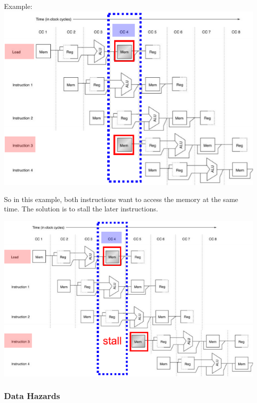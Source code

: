 \documentclass[letterpaper,12pt]{article}
\begin{document}
Example:
\includegraphics*[scale = 0.7]{./Image/Structural Hazard example.png}

So in this example, both instructions want to access the memory at the same time. The solution is to stall the later instructions.

\includegraphics*[scale = 0.7]{./Image/Structural Hazard solution.png}

\subsubsection{Data Hazards}
\end{document}
